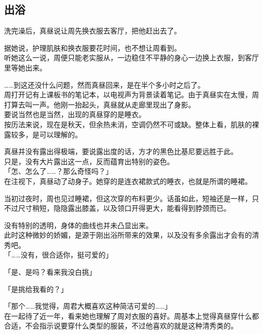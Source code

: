 \subsection{出浴}

洗完澡后，真昼说让周先换衣服去客厅，把他赶出去了。

据她说，护理肌肤和换衣服要花时间，也不想让周看到。\\

听她这么一说，周便只能老实服从，一边稳住不平静的身心一边换上衣服，到客厅里等她出来。

……到这还没什么问题，然而真昼回来，是在半个多小时之后了。\\

周打开记有上课板书的笔记本，以电视声为背景读着笔记。由于真昼实在太慢，周打算去叫一声。他刚一抬起头，真昼就从走廊里现出了身影。\\

要说当然也是当然，出现的真昼穿的是睡衣。\\

按历法来说，现在是秋天，但余热未消，空调仍然不可或缺。整体上看，肌肤的裸露较多，是可以理解的。

真昼并没有露出得极端，要说露出度的话，方才的黑色比基尼要远胜于此。\\

只是，没有大片露出这一点，反而蕴育出特别的姿色。\\

「怎、怎么了……？那么奇怪吗？」\\

在注视下，真昼动了动身子。她穿的是连衣裙款式的睡衣，也就是所谓的睡裙。

当初过夜时，周也见过睡裙，但这次穿的布料更少。话虽如此，短袖还是一样，只不过尺寸稍短，隐隐露出膝盖，以及领口开得更大，能看得到脖颈而已。

没有特别的透明，身体的曲线也并未凸显出来。\\

此时这种微妙的娇媚，是源于刚出浴所带来的效果，以及没有多余露出才会有的清秀吧。\\

「……没有，很合适你，挺可爱的」

「是、是吗？看来我没白挑」

「是挑给我看的？」

「那个……我觉得，周君大概喜欢这种简洁可爱的……」\\

在一起待了近一年，看来她也理解了周对衣服的喜好。周基本上觉得真昼穿什么都合适，不会指示说要穿什么类型的服装，不过他喜欢的就是这种清秀类的。

